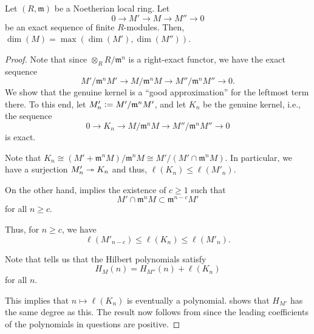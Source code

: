 \documentclass[12pt]{article}
\begin{document}
\begin{prop} \label{prop:local-dimensions-short-exact-sequence}
	Let $(R, \mathfrak{m})$ be a Noetherian local ring. Let
	\begin{equation*} 
		0 \to M' \to M \to M'' \to 0
	\end{equation*}
	be an exact sequence of finite $R$-modules. Then, $\dim(M) = \max(\dim(M'), \dim(M''))$.
\end{prop}
\begin{proof} 
	Note that since $\otimes_{R} R/\mathfrak{m}^{n}$ is a right-exact functor, we have the exact sequence
	\begin{equation*} 
		M'/\mathfrak{m}^{n} M' \to M/\mathfrak{m}^{n} M \to M''/\mathfrak{m}^{n} M'' \to 0.
	\end{equation*}
	We show that the genuine kernel is a ``good approximation'' for the leftmost term there. To this end, let $M'_{n} \vcentcolon= M'/\mathfrak{m}^{n} M'$, and let $K_{n}$ be the genuine kernel, i.e., the sequence
	\begin{equation} \label{eq:003}
		0 \to K_{n} \to M/\mathfrak{m}^{n} M \to M''/\mathfrak{m}^{n} M'' \to 0
	\end{equation}
	is exact.

	Note that $K_{n} \cong (M' + \mathfrak{m}^{n}M)/\mathfrak{m}^{n}M \cong M'/(M' \cap \mathfrak{m}^{n}M)$. In particular, we have a surjection $M'_{n} \twoheadrightarrow K_{n}$ and thus, $\ell(K_{n}) \le \ell(M'_{n})$.

	On the other hand,  implies the existence of $c \ge 1$ such that
	\begin{equation*} 
		M' \cap \mathfrak{m}^{n} M \subset \mathfrak{m}^{n - c} M'
	\end{equation*}
	for all $n \ge c$.

	Thus, for $n \ge c$, we have
	\begin{equation} \label{eq:004}
		\ell(M'_{n - c}) \le \ell(K_{n}) \le \ell(M'_{n}).
	\end{equation}

	Note that  tells us that the Hilbert polynomials satisfy
	\begin{equation} \label{eq:005}
		H_{M}(n) = H_{M''}(n) + \ell(K_{n})
	\end{equation}
	for all $n$.

	This implies that $n \mapsto \ell(K_{n})$ is eventually a polynomial.  shows that $H_{M'}$ has the same degree as this. The result now follows from  since the leading coefficients of the polynomials in questions are positive.
\end{proof}
\end{document}
